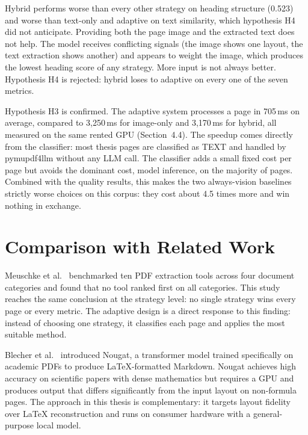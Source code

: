 Hybrid performs worse than every other strategy on heading structure (0.523)
and worse than text-only and adaptive on text similarity, which hypothesis
H4 did not anticipate. Providing both the page image and the extracted text
does not help. The model receives conflicting signals (the image shows one
layout, the text extraction shows another) and appears to weight the image,
which produces the lowest heading score of any strategy. More input is not
always better. Hypothesis H4 is rejected: hybrid loses to adaptive on every
one of the seven metrics.

Hypothesis H3 is confirmed. The adaptive system processes a page in 705\,ms
on average, compared to 3{,}250\,ms for image-only and 3{,}170\,ms for
hybrid, all measured on the same rented GPU (Section~4.4). The speedup comes
directly from the classifier: most thesis pages are classified as TEXT and
handled by pymupdf4llm without any LLM call. The classifier adds a small
fixed cost per page but avoids the dominant cost, model inference, on the
majority of pages. Combined with the quality results, this makes the two
always-vision baselines strictly worse choices on this corpus: they cost
about 4.5 times more and win nothing in exchange.

\section{Comparison with Related Work}

Meuschke et al.\ \autocite{meuschke2023} benchmarked ten PDF extraction
tools across four document categories and found that no tool ranked
first on all categories. This study reaches the same conclusion at the
strategy level: no single strategy wins every page or every metric. The
adaptive design is a direct response to this finding: instead of
choosing one strategy, it classifies each page and applies the most
suitable method.

Blecher et al.\ \autocite{blecher2023} introduced Nougat, a transformer
model trained specifically on academic PDFs to produce LaTeX-formatted
Markdown. Nougat achieves high accuracy on scientific papers with dense
mathematics but requires a GPU and produces output that differs
significantly from the input layout on non-formula pages. The approach
in this thesis is complementary: it targets layout fidelity over LaTeX
reconstruction and runs on consumer hardware with a general-purpose
local model.

